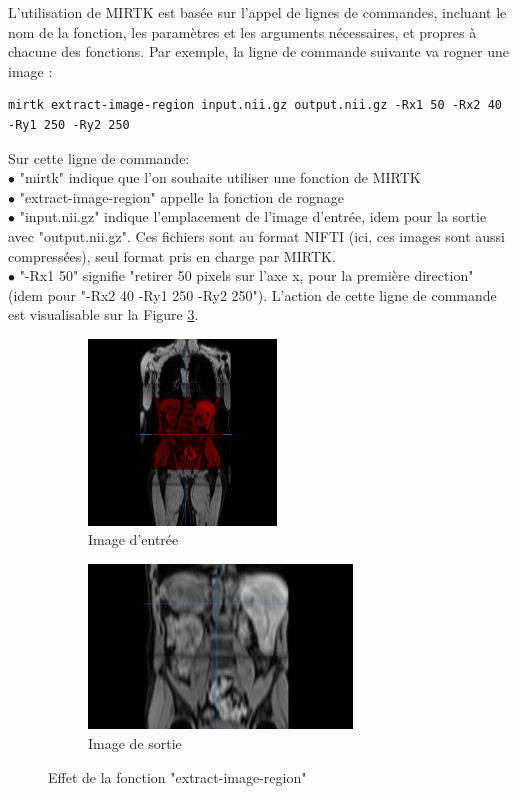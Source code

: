 \documentclass[10pt]{report}
\begin{document}
%	
	L'utilisation de MIRTK est basée sur l'appel de lignes de commandes, incluant le nom de la fonction, les paramètres et les arguments nécessaires, et propres à chacune des fonctions. Par exemple, la ligne de commande suivante va rogner une image :
	\begin{lstlisting}
mirtk extract-image-region input.nii.gz output.nii.gz -Rx1 50 -Rx2 40 -Ry1 250 -Ry2 250
	\end{lstlisting}
	Sur cette ligne de commande:
	\\{$\bullet$} "mirtk" indique que l'on souhaite utiliser une fonction de MIRTK
	\\{$\bullet$} "extract-image-region" appelle la fonction de rognage
	\\{$\bullet$} "input.nii.gz" indique l'emplacement de l'image d'entrée, idem pour la sortie avec "output.nii.gz". Ces fichiers sont au format NIFTI (ici, ces images sont aussi compressées), seul format pris en charge par MIRTK.
	\\{$\bullet$} "-Rx1 50" signifie "retirer 50 pixels sur l'axe x, pour la première direction" (idem pour "-Rx2 40 -Ry1 250 -Ry2 250"). 
	L'action de cette ligne de commande est visualisable sur la Figure \ref{Effet de la fonction "extract-image-region"}.
	\begin{figure}[h!]
		\centering
		\begin{subfigure}{.5\textwidth}
			\centering
			\includegraphics[width=5cm]{Reports/figures/mirtkextractregion1d.png}
			\caption{Image d'entrée}
			\label{Image d'entrée}
		\end{subfigure}%
		\begin{subfigure}{.5\textwidth}
			\centering
			\includegraphics[width=7cm]{Reports/figures/mirtkextractregion2_1d.png}
			\caption{Image de sortie}
			\label{Image de sortie}
		\end{subfigure}
		\caption{Effet de la fonction "extract-image-region"}
		\label{Effet de la fonction "extract-image-region"}
	\end{figure}~\par
\end{document}

